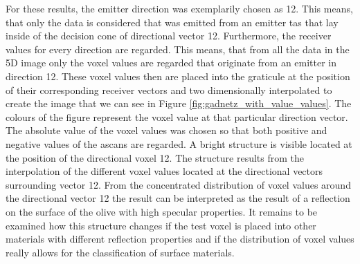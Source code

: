 For these results, the emitter direction was exemplarily chosen as 12. This means, that only the data is considered that was emitted from an emitter \ac{tas} that lay inside of the decision cone of directional vector 12. Furthermore, the receiver values for every direction are regarded. This means, that from all the data in the 5D image only the voxel values are regarded that originate from an emitter in direction 12. These voxel values then are placed into the graticule at the position of their corresponding receiver vectors and two dimensionally interpolated to create the image that we can see in Figure \ref{fig:gadnetz_with_value_values}. The colours of the figure represent the voxel value at that particular direction vector. The absolute value of the voxel values was chosen so that both positive and negative values of the \acp{ascan} are regarded. A bright structure is visible located at the position of the directional voxel 12. The structure results from the interpolation of the different voxel values located at the directional vectors surrounding vector 12. From the concentrated distribution of voxel values around the directional vector 12 the result can be interpreted as the result of a reflection on the surface of the olive with high specular properties. It remains to be examined how this structure changes if the test voxel is placed into other materials with different reflection properties and if the distribution of voxel values really allows for the classification of surface materials.  








